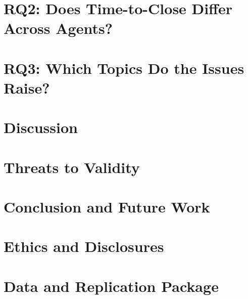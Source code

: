 \documentclass[conference]{IEEEtran}
\begin{document}
\section{RQ2: Does Time-to-Close Differ Across Agents?}\label{sec:rq2}


\section{RQ3: Which Topics Do the Issues Raise?}


\section{Discussion}\label{sec:discussion}


\section{Threats to Validity}\label{sec:threats}


\section{Conclusion and Future Work}\label{sec:conclusion}


\section*{Ethics and Disclosures}


\section*{Data and Replication Package}




\end{document}
